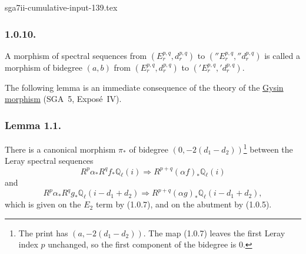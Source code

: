\begin{filecontents*}{sga7ii-cumulative-input-139.tex}
\subsubsection*{1.0.10.}
A morphism of spectral sequences from
$(E_r^{p,q},d_r^{p,q})$ to $({}''E_r^{p,q},{}''d_r^{p,q})$ is called a
morphism of bidegree $(a,b)$ from $(E_r^{p,q},d_r^{p,q})$ to
$({}'E_r^{p,q},{}'d_r^{p,q})$.

The following lemma is an immediate consequence of the theory of the
\underline{Gysin morphism} (SGA~5, Expos\'e~IV).

\subsubsection*{Lemma 1.1.}
There is a canonical morphism $\pi_*$ of bidegree
$(0,-2(d_1-d_2))$\footnote{The print has $(a,-2(d_1-d_2))$.  The map
(1.0.7) leaves the first Leray index $p$ unchanged, so the first component
of the bidegree is $0$.} between the Leray spectral sequences
\begin{equation}\tag{1.1.0}
R^p\alpha_*R^qf_*\mathbb Q_\ell(i)\Longrightarrow
R^{p+q}(\alpha f)_*\mathbb Q_\ell(i)
\end{equation}
and
\begin{equation}\tag{1.1.1}
R^p\alpha_*R^qg_*\mathbb Q_\ell(i-d_1+d_2)\Longrightarrow
R^{p+q}(\alpha g)_*\mathbb Q_\ell(i-d_1+d_2),
\end{equation}
which is given on the $E_2$ term by (1.0.7), and on the abutment by
(1.0.5).


\end{filecontents*}
